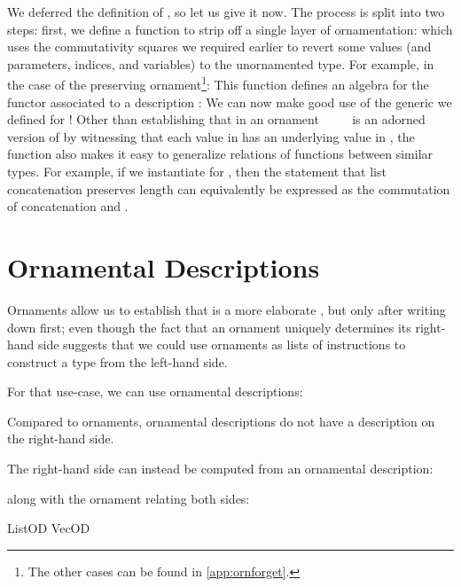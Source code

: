 We deferred the definition of , so let us give it now. The process is split into two steps: first, we define a function to strip off a single layer of ornamentation:
which uses the commutativity squares we required earlier to revert some values (and parameters, indices, and variables) to the unornamented type. For example, in the case of the  preserving ornament\footnote{The other cases can be found in \autoref{app:ornforget}.}:
This function defines an algebra for the functor associated to a description :
We can now make good use of the generic  we defined for !
Other than establishing that  in an ornament \ \ \ \  is an adorned version of  by witnessing that each value in  has an underlying value in , the function  also makes it easy to generalize relations of functions between similar types. For example, if we instantiate  for , then the statement that list concatenation preserves length can equivalently be expressed as the commutation of concatenation and .



\section{Ornamental Descriptions}\label{sec:background-ornamental-descriptions}
Ornaments allow us to establish that  is a more elaborate , but only after writing down  first; even though the fact that an ornament uniquely determines its right-hand side suggests that we could use ornaments as lists of instructions to construct a type from the left-hand side.

For that use-case, we can use ornamental descriptions:

\begin{outline}
Compared to ornaments, ornamental descriptions do not have a description on the right-hand side.

The right-hand side can instead be computed from an ornamental description:

along with the ornament relating both sides:

ListOD
VecOD
\end{outline}